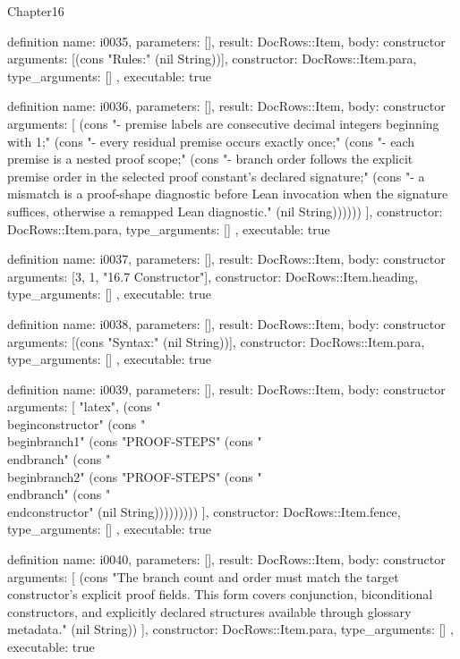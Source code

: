 \begin{lexlean}{Chapter16}
\begin{semanticmodule}
definition{
  name: i0035,
  parameters: [],
  result: DocRows::Item,
  body: constructor{
    arguments: [(cons "Rules:" (nil String))],
    constructor: DocRows::Item.para,
    type_arguments: []
  },
  executable: true
}

definition{
  name: i0036,
  parameters: [],
  result: DocRows::Item,
  body: constructor{
    arguments: [
      (cons "- premise labels are consecutive decimal integers beginning with 1;" (cons "- every residual premise occurs exactly once;" (cons "- each premise is a nested proof scope;" (cons "- branch order follows the explicit premise order in the selected proof constant's declared signature;" (cons "- a mismatch is a proof-shape diagnostic before Lean invocation when the signature suffices, otherwise a remapped Lean diagnostic." (nil String))))))
    ],
    constructor: DocRows::Item.para,
    type_arguments: []
  },
  executable: true
}

definition{
  name: i0037,
  parameters: [],
  result: DocRows::Item,
  body: constructor{
    arguments: [3, 1, "16.7 Constructor"],
    constructor: DocRows::Item.heading,
    type_arguments: []
  },
  executable: true
}

definition{
  name: i0038,
  parameters: [],
  result: DocRows::Item,
  body: constructor{
    arguments: [(cons "Syntax:" (nil String))],
    constructor: DocRows::Item.para,
    type_arguments: []
  },
  executable: true
}

definition{
  name: i0039,
  parameters: [],
  result: DocRows::Item,
  body: constructor{
    arguments: [
      "latex",
      (cons "\\begin{constructor}" (cons "\\begin{branch}{1}" (cons "PROOF-STEPS" (cons "\\end{branch}" (cons "\\begin{branch}{2}" (cons "PROOF-STEPS" (cons "\\end{branch}" (cons "\\end{constructor}" (nil String)))))))))
    ],
    constructor: DocRows::Item.fence,
    type_arguments: []
  },
  executable: true
}

definition{
  name: i0040,
  parameters: [],
  result: DocRows::Item,
  body: constructor{
    arguments: [
      (cons "The branch count and order must match the target constructor's explicit proof fields. This form covers conjunction, biconditional constructors, and explicitly declared structures available through glossary metadata." (nil String))
    ],
    constructor: DocRows::Item.para,
    type_arguments: []
  },
  executable: true
}


\end{semanticmodule}
\end{lexlean}
